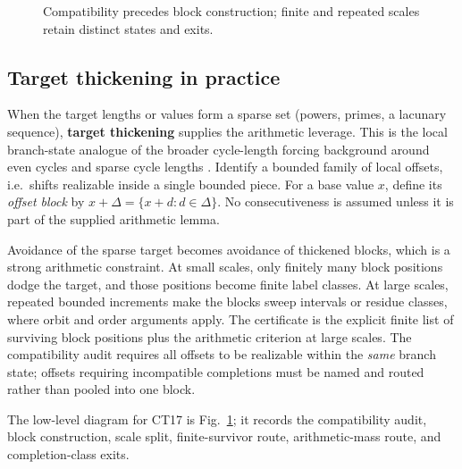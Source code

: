 \documentclass[
  11pt,
]{article}
\theoremstyle{definition}
\begin{document}
\begin{figure}[p]
{%
}
\caption[Closure-tactic 17: exact target-thickening machine]{Compatibility precedes block construction; finite and repeated scales retain distinct states and exits.}
\label{fig:ct17-target-thickening}
\end{figure}
\FloatBarrier


\subsection*{Target thickening in practice}

When the target lengths or values form a sparse set (powers, primes, a
lacunary sequence), \textbf{target thickening} supplies the arithmetic
leverage. This is the local branch-state analogue of the broader
cycle-length forcing background around even cycles and sparse cycle
lengths
\citep{bondy-simonovits-1974-even-cycles, sudakov-verstraete-2008-cycle-lengths}.
Identify a bounded family of local offsets, i.e.~shifts realizable
inside a single bounded piece. For a base value \(x\), define its
\emph{offset block} by
\(x+\Delta=\{x+d:d\in\Delta\}\). No consecutiveness is assumed unless it
is part of the supplied arithmetic lemma.

Avoidance of the sparse target becomes avoidance of thickened blocks,
which is a strong arithmetic constraint. At small scales, only finitely
many block positions dodge the target, and those positions become finite
label classes. At large scales, repeated bounded increments make the
blocks sweep intervals or residue classes, where orbit and order
arguments apply. The certificate is the explicit finite list of
surviving block positions plus the arithmetic criterion at large scales.
The compatibility audit requires all offsets to be realizable within the
\emph{same} branch state; offsets requiring incompatible completions must
be named and routed rather than pooled into one block.

The low-level diagram for CT17 is Fig.~\ref{fig:ct17-target-thickening};
it records the compatibility audit, block construction, scale split,
finite-survivor route, arithmetic-mass route, and completion-class exits.
\end{document}
